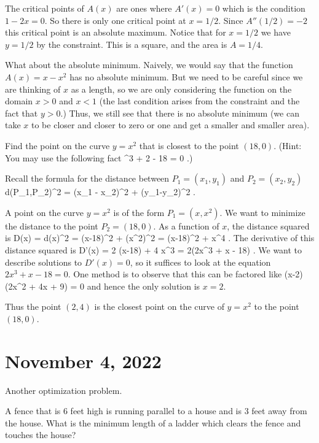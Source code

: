 \documentclass[11pt]{amsart}
\begin{document}
The critical points of $A(x)$ are ones where $A'(x) = 0$ which is the condition $1 - 2x = 0$. So there is only one critical point at $x = 1/2$.
Since $A''(1/2) = -2$ this critical point is an absolute maximum. 
Notice that for $x=1/2$ we have $y=1/2$ by the constraint.
This is a square, and the area is $A=1/4$. 

What about the absolute minimum. 
Naively, we would say that the function $A(x) = x - x^2$ has no absolute minimum. 
But we need to be careful since we are thinking of $x$ as a length, so we are only considering the function on the domain $x > 0$ and $x < 1$ (the last condition arises from the constraint and the fact that $y > 0$.) 
Thus, we still see that there is no absolute minimum (we can take $x$ to be closer and closer to zero or one and get a smaller and smaller area).

\newpage

\begin{eg}
Find the point on the curve $y = x^2$ that is closest to the point $(18,0)$. 
(Hint: You may use the following fact
 ^3 + 2 - 18 = 0  \quad .)
\eeqn
\end{eg} 

\newpage

Recall the formula for the distance between $P_1=(x_1,y_1)$ and $P_2=(x_2,y_2)$
\beqn
d(P_1,P_2)^2 = (x_1 - x_2)^2 + (y_1-y_2)^2 .
\eeqn

A point on the curve $y=x^2$ is of the form $P_1 = (x,x^2)$. 
We want to minimize the distance to the point $P_2 = (18,0)$. 
As a function of $x$, the distance squared is
\beqn
D(x) = d(x)^2 = (x-18)^2 + (x^2)^2 = (x-18)^2 + x^4 .
\eeqn
The derivative of this distance squared is
\beqn
D'(x) = 2 (x-18) + 4 x^3 = 2(2x^3 + x - 18) .
\eeqn
We want to describe solutions to $D'(x) = 0$, so it suffices to look at the equation $2x^3+x-18=0$. 
One method is to observe that this can be factored like
\beqn
(x-2)(2x^2 + 4x + 9) = 0 
\eeqn
and hence the only solution is $x=2$. 

Thus the point $(2,4)$ is the closest point on the curve of $y=x^2$ to the point $(18,0)$.

\newpage

\section*{November 4, 2022}

Another optimization problem. 

\begin{eg} 
A fence that is 6 feet high is running parallel to a house and is 3 feet away from the house.
What is the minimum length of a ladder which clears the fence and touches the house? 
\end{eg} 
\end{document}
